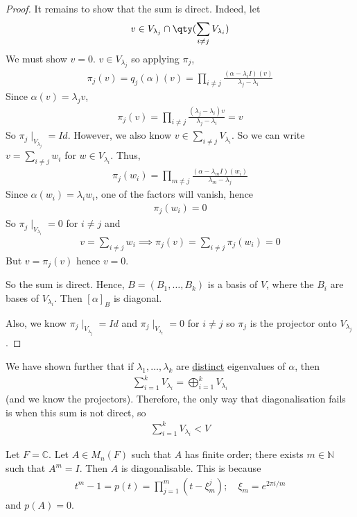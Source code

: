 \begin{proof}
	It remains to show that the sum is direct.
	Indeed, let
	\begin{align*}
		v \in V_{\lambda_j} \cap \qty(\sum_{i \neq j} V_{\lambda_i})
	\end{align*}
	We must show $v = 0$.
	$v \in V_{\lambda_j}$ so applying $\pi_j$,
	\begin{align*}
		\pi_j(v) = q_j(\alpha)(v) = \prod_{i \neq j} \frac{(\alpha - \lambda_i I)(v)}{\lambda_j - \lambda_i}
	\end{align*}
	Since $\alpha(v) = \lambda_j v$,
	\begin{align*}
		\pi_j(v) = \prod_{i \neq j} \frac{(\lambda_j - \lambda_i)v}{\lambda_j - \lambda_i} = v
	\end{align*}
	So $\pi_j \mid_{V_{\lambda_j}} = Id$.
	However, we also know $v \in \sum_{i \neq j} V_{\lambda_i}$.
	So we can write $v = \sum_{i \neq j} w_i$ for $w \in V_{\lambda_i}$.
	Thus,
	\begin{align*}
		\pi_j(w_i) = \prod_{m \neq j} \frac{(\alpha - \lambda_m I)(w_i)}{\lambda_m - \lambda_j}
	\end{align*}
	Since $\alpha(w_i) = \lambda_i w_i$, one of the factors will vanish, hence
	\begin{align*}
		\pi_j(w_i) = 0
	\end{align*}
	So $\pi_j \mid_{V_{\lambda_i}} = 0$ for $i \neq j$ and
	\begin{align*}
		v = \sum_{i \neq j} w_i \implies \pi_j(v) = \sum_{i \neq j} \pi_j(w_i) = 0
	\end{align*}
	But $v = \pi_j(v)$ hence $v = 0$.

	So the sum is direct.
	Hence, $B = (B_1, \dots, B_k)$ is a basis of $V$, where the $B_i$ are bases of $V_{\lambda_i}$.
	Then $[\alpha]_B$ is diagonal.

	Also, we know $\pi_j \mid_{V_{\lambda_j}} = Id$ and $\pi_j \mid_{V_{\lambda_i}} = 0$ for $i \neq j$ so $\pi_j$ is the projector onto $V_{\lambda_j}$.
\end{proof}
\begin{remark}
	We have shown further that if $\lambda_1, \dots, \lambda_k$ are \underline{distinct} eigenvalues of $\alpha$, then
	\begin{align*}
		\sum_{i=1}^k V_{\lambda_i} = \bigoplus_{i=1}^k V_{\lambda_i}
	\end{align*}
	(and we know the projectors).
	Therefore, the only way that diagonalisation fails is when this sum is not direct, so
	\begin{align*}
		\sum_{i=1}^k V_{\lambda_i} < V
	\end{align*}
\end{remark}
\begin{example}
	Let $F = \mathbb C$.
	Let $A \in M_n(F)$ such that $A$ has finite order; there exists $m \in \mathbb N$ such that $A^m = I$.
	Then $A$ is diagonalisable.
	This is because
	\begin{align*}
		t^m - 1 = p(t) = \prod_{j=1}^m (t - \xi_m^j);\quad \xi_m = e^{2 \pi i/m}
	\end{align*}
	and $p(A) = 0$.
\end{example}

